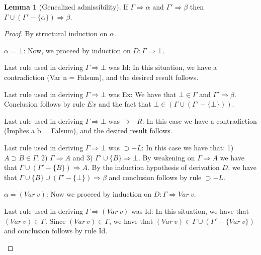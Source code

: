 \documentclass[12pt]{article}
\theoremstyle{definition}
\newtheorem{Lemma}{Lemma}
\begin{document}
\begin{Lemma}[Genealized admissibility]\label{lemma:admissibility}
  If $\Gamma \Rightarrow \alpha$ and $\Gamma' \Rightarrow \beta$ then $\Gamma
  \cup (\Gamma' - \{\alpha\}) \Rightarrow \beta$.
\end{Lemma}
\begin{proof}
  By structural induction on $\alpha$.
  \begin{Cases}
     \item $\alpha = \bot$: Now, we proceed by induction on
       $D : \Gamma \Rightarrow \bot$.
    \begin{Cases}
      \item Last rule used in deriving $\Gamma \Rightarrow \bot$ was Id: In this
            situation, we have a contradiction (Var n = Falsum), and the desired
            result follows.
      \item Last rule used in deriving $\Gamma \Rightarrow \bot$ was Ex: We have that
            $\bot \in \Gamma$ and $\Gamma' \Rightarrow \beta$. Conclusion follows by
            rule $Ex$ and the fact that $\bot \in (\Gamma \cup (\Gamma' -
            \{\bot\}))$.
      \item Last rule used in deriving $\Gamma\Rightarrow \bot$ was $\supset-R$:
            In this case we have a contradiction (Implies a b = Falsum), and the
            desired result follows.
      \item Last rule used in deriving $\Gamma\Rightarrow \bot$ was $\supset-L$:
            In this case we have that: 1) $A \supset B \in \Gamma$; 2)
            $\Gamma \Rightarrow A$ and 3) $\Gamma' \cup \{B\} \Rightarrow \bot$. By
            weakening on $\Gamma \Rightarrow A$ we have that
            $\Gamma \cup (\Gamma' -\{B\})\Rightarrow A$. By the induction hypothesis
            of derivation $D$, we have that
            $\Gamma \cup \{B\} \cup (\Gamma' - \{\bot\}) \Rightarrow \beta$ and
            conclusion follows by rule $\supset-L$.
    \end{Cases}
    \item $\alpha = (Var\:v)$: Now we proceed by induction on
      $D : \Gamma \Rightarrow Var\:v$.
      \begin{Cases}
         \item Last rule used in deriving $\Gamma \Rightarrow (Var\:v)$ was Id:
           In this situation, we have that $(Var\:v) \in \Gamma$. Since
           $(Var\:v) \in \Gamma$, we have that $(Var\:v) \in \Gamma \cup (\Gamma'
           - \{Var\:v\})$ and conclusion follows by rule Id.

\end{Cases}
\end{Cases}
\end{proof}
\end{document}

